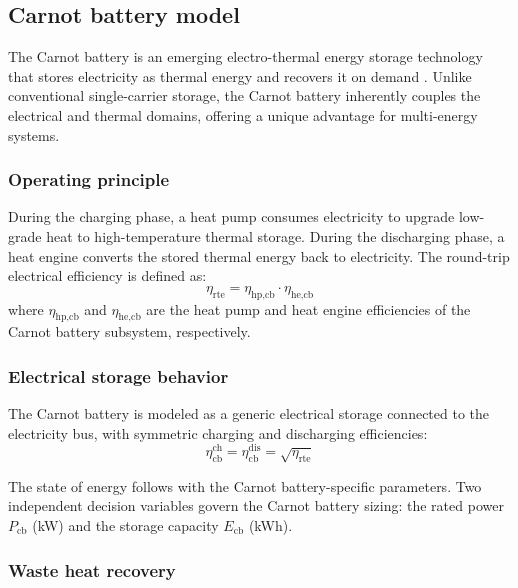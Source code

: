 \subsection{Carnot battery model}
\label{sec:carnot}

The Carnot battery is an emerging electro-thermal energy storage technology that stores electricity as thermal energy and recovers it on demand \cite{dumont2022carnot,novotny2022review}. Unlike conventional single-carrier storage, the Carnot battery inherently couples the electrical and thermal domains, offering a unique advantage for multi-energy systems.

\subsubsection{Operating principle}

During the charging phase, a heat pump consumes electricity to upgrade low-grade heat to high-temperature thermal storage. During the discharging phase, a heat engine converts the stored thermal energy back to electricity. The round-trip electrical efficiency is defined as:
\begin{equation}
    \eta_{\text{rte}} = \eta_{\text{hp,cb}} \cdot \eta_{\text{he,cb}}
    \label{eq:cb_rte}
\end{equation}
where $\eta_{\text{hp,cb}}$ and $\eta_{\text{he,cb}}$ are the heat pump and heat engine efficiencies of the Carnot battery subsystem, respectively.

\subsubsection{Electrical storage behavior}

The Carnot battery is modeled as a generic electrical storage connected to the electricity bus, with symmetric charging and discharging efficiencies:
\begin{equation}
    \eta_{\text{cb}}^{\text{ch}} = \eta_{\text{cb}}^{\text{dis}} = \sqrt{\eta_{\text{rte}}}
    \label{eq:cb_eff}
\end{equation}

The state of energy follows  with the Carnot battery-specific parameters. Two independent decision variables govern the Carnot battery sizing: the rated power $P_{\text{cb}}$ (\si{kW}) and the storage capacity $E_{\text{cb}}$ (\si{kWh}).

\subsubsection{Waste heat recovery}

